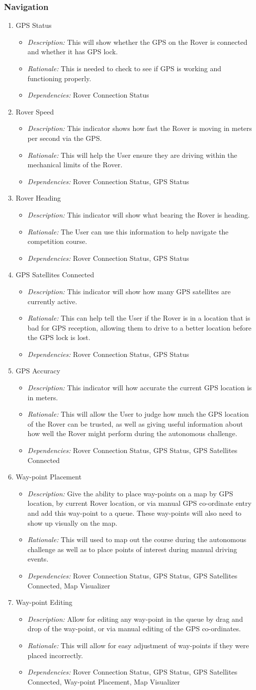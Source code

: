 \documentclass[onecolumn, draftclsnofoot, 10pt, compsoc]{IEEEtran}
\newcommand{\functRequ}[4]{
\item #1%
\par
\begin{itemize}
\item \textit{Description:} #2.%
\item \textit{Rationale:} #3.%
\item \textit{Dependencies:} #4%
\end{itemize}
}
\begin{document}
\subsubsection{Navigation}
\begin{enumerate}
\functRequ{GPS Status}
{This will show whether the GPS on the Rover is connected and whether it has GPS lock}
{This is needed to check to see if GPS is working and functioning properly}
{Rover Connection Status}

\functRequ{Rover Speed}
{This indicator shows how fast the Rover is moving in meters per second via the GPS}
{This will help the User ensure they are driving within the mechanical limits of the Rover}
{Rover Connection Status, GPS Status}

\functRequ{Rover Heading}
{This indicator will show what bearing the Rover is heading}
{The User can use this information to help navigate the competition course}
{Rover Connection Status, GPS Status}

\functRequ{GPS Satellites Connected}
{This indicator will show how many GPS satellites are currently active}
{This can help tell the User if the Rover is in a location that is bad for GPS reception, allowing them to drive to a better location before the GPS lock is lost}
{Rover Connection Status, GPS Status}

\functRequ{GPS Accuracy}
{This indicator will how accurate the current GPS location is in meters}
{This will allow the User to judge how much the GPS location of the Rover can be trusted, as well as giving useful information about how well the Rover might perform during the autonomous challenge}
{Rover Connection Status, GPS Status, GPS Satellites Connected}

\functRequ{Way-point Placement}
{Give the ability to place way-points on a map by GPS location, by current Rover location, or via manual GPS co-ordinate entry and add this way-point to a queue.
These way-points will also need to show up visually on the map}
{This will used to map out the course during the autonomous challenge as well as to place points of interest during manual driving events}
{Rover Connection Status, GPS Status, GPS Satellites Connected, Map Visualizer}

\functRequ{Way-point Editing}
{Allow for editing any way-point in the queue by drag and drop of the way-point, or via manual editing of the GPS co-ordinates}
{This will allow for easy adjustment of way-points if they were placed incorrectly}
{Rover Connection Status, GPS Status, GPS Satellites Connected, Way-point Placement, Map Visualizer}


\end{enumerate}
\end{document}
